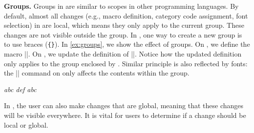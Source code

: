 \documentclass{ltugboat}
\begin{document}
\par\medskip\noindent\textbf{Groups.}
Groups in \LT{} are similar to scopes in other programming languages.
By default, almost all changes (e.g., macro definition, category code assignment, font selection) in \LT{} are local, which means they only apply to the current group.
These changes are not visible outside the group.
In \LT{}, one way to create a new group is to use braces (\verb|{}|).
In \cref{ex:groups}, we show the effect of groups.
On , we define the macro \inltex|\abc|.
On , we update the definition of \inltex|\abc|.
Notice how the updated definition only applies to the group enclosed by .
Similar principle is also reflected by fonts: the \inltex|\normalfont| command on  only affects the contents within the group.
\begin{latexsample}[examplelabel={ex:groups},exampletitle={Groups}]
\itshape
\def\abc{abc }%
\abc%
{%
  \normalfont%
  \def\abc{def }%
  \abc%
}%
\abc%
\end{latexsample}
\noindent In \LT{}, the user can also make changes that are global, meaning that these changes will be visible everywhere.
It is vital for \LT{} users to determine if a change should be local or global.
\end{document}
